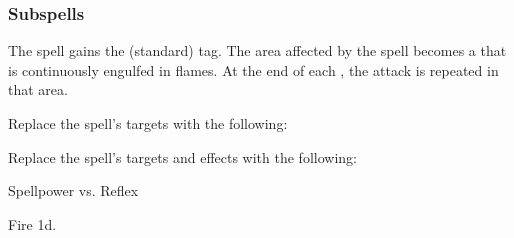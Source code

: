 \subsubsection{Subspells}



The spell gains the  (standard) tag.
The area affected by the spell becomes a  that is continuously engulfed in flames.
At the end of each , the attack is repeated in that area.









Replace the spell's targets with the following:
\begin{spellcontent}

\begin{augmenttargetinginfo}




\end{augmenttargetinginfo}

\end{spellcontent}








Replace the spell's targets and effects with the following:
\begin{spellcontent}

\begin{augmenttargetinginfo}




\end{augmenttargetinginfo}


\begin{augmenteffects}




\begin{spellattack}{Spellpower vs. Reflex}


\spellsuccess Fire  \plus1d.


\end{spellattack}



\end{augmenteffects}

\end{spellcontent}





